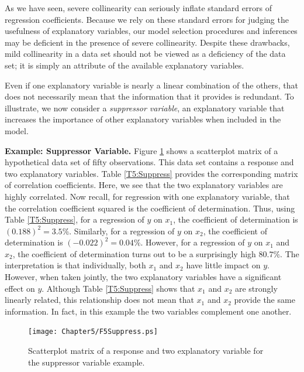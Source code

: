 As we have seen, severe collinearity can seriously inflate standard
errors of regression coefficients. Because we rely on these standard
errors for judging the usefulness of explanatory variables, our
model selection procedures and inferences may be deficient in the
presence of severe collinearity. Despite these drawbacks, mild
collinearity in a data set should not be viewed as a deficiency of
the data set; it is simply an attribute of the available explanatory
variables.

Even if one explanatory variable is nearly a linear combination of
the others, that does not necessarily mean that the information that
it provides is redundant. To illustrate, we now consider a
\textit{suppressor variable}, an explanatory variable that increases
the importance of other explanatory variables when included in the
model.

\linejed

\textbf{Example: Suppressor Variable.} Figure \ref{F5:Suppress}
shows a scatterplot matrix of a hypothetical data set of fifty
observations. This data set contains a response and two explanatory
variables. Table \ref{T5:Suppress} provides the corresponding matrix
of correlation coefficients. Here, we see that the two explanatory
variables are highly correlated. Now recall, for regression with one
explanatory variable, that the correlation coefficient squared is
the coefficient of determination. Thus, using Table
\ref{T5:Suppress}, for a regression of $y$ on $x_1$, the coefficient
of determination is $(0.188)^2=3.5\%$. Similarly, for a regression
of $y$ on $x_2$, the coefficient of
determination is $(-0.022)^2=0.04\%$. However, for a regression of $y$ on $%
x_1$ and $x_2$, the coefficient of determination turns out to be a
surprisingly high $80.7\%$. The interpretation is that individually, both $%
x_1$ and $x_2$ have little impact on $y$. However, when taken
jointly, the two explanatory variables have a significant effect on
$y$. Although Table \ref{T5:Suppress} shows that $x_1$ and $x_2$ are
strongly linearly related, this relationship does not mean that
$x_1$ and $x_2$ provide the same information. In fact, in this
example the two variables complement one another.

\begin{figure}[htp]
  \begin{center}
    \texttt{[image: Chapter5/F5Suppress.ps]}
    \caption{\label{F5:Suppress} \small  Scatterplot matrix of a
response and two explanatory variable for the suppressor variable
example.}
  \end{center}
\end{figure}


